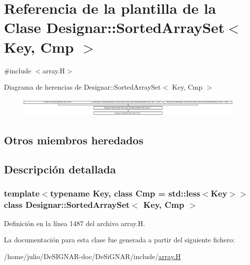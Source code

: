 \hypertarget{class_designar_1_1_sorted_array_set}{}\section{Referencia de la plantilla de la Clase Designar\+:\+:Sorted\+Array\+Set$<$ Key, Cmp $>$}
\label{class_designar_1_1_sorted_array_set}


{\ttfamily \#include $<$array.\+H$>$}

Diagrama de herencias de Designar\+:\+:Sorted\+Array\+Set$<$ Key, Cmp $>$\begin{figure}[H]
\begin{center}
\leavevmode
\includegraphics[height=0.942761cm]{class_designar_1_1_sorted_array_set}
\end{center}
\end{figure}
\subsection*{Otros miembros heredados}


\subsection{Descripción detallada}
\subsubsection*{template$<$typename Key, class Cmp = std\+::less$<$\+Key$>$$>$\newline
class Designar\+::\+Sorted\+Array\+Set$<$ Key, Cmp $>$}



Definición en la línea 1487 del archivo array.\+H.



La documentación para esta clase fue generada a partir del siguiente fichero\+:\begin{DoxyCompactItemize}
\item 
/home/julio/\+De\+S\+I\+G\+N\+A\+R-\/doc/\+De\+Si\+G\+N\+A\+R/include/\hyperlink{array_8_h}{array.\+H}\end{DoxyCompactItemize}
